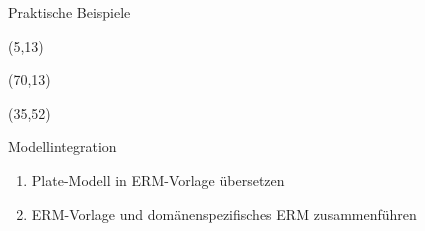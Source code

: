 \documentclass{beamer}
\newcommand{\adjustTikzSize}[0]{\Large}
\newcommand{\tikzScale}[0]{0.55}
\begin{document}
\begin{frame}{Praktische Beispiele}
\begin{textblock}{10}(5,13)
	\scalebox{\tikzScale}{\adjustTikzSize }
\end{textblock}
\begin{textblock}{10}(70,13)
	\scalebox{\tikzScale}{\adjustTikzSize }
\end{textblock}
\begin{textblock}{10}(35,52)
	\scalebox{\tikzScale}{\adjustTikzSize }
\end{textblock}
\end{frame}

\begin{frame}[t]{Modellintegration}
\begin{center}
\scalebox{\tikzScale}{\adjustTikzSize }
\end{center}
\begin{enumerate}
\item Plate-Modell in ERM-Vorlage übersetzen
\item ERM-Vorlage und domänenspezifisches ERM zusammenführen
\end{enumerate}
\end{frame}
\end{document}
